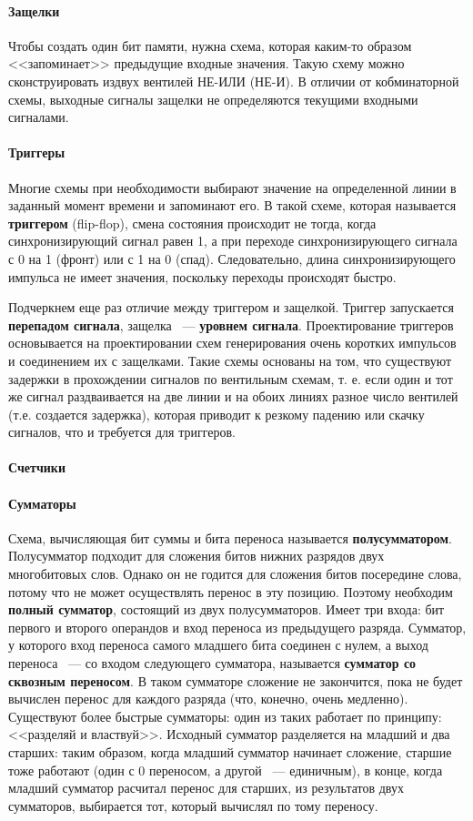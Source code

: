\documentclass[10pt]{article}
\begin{document}
	\paragraph{Защелки}
	Чтобы создать один бит памяти, нужна схема, которая каким-то образом <<запоминает>> предыдущие входные значения. Такую схему можно сконструировать издвух вентилей НЕ-ИЛИ (НЕ-И). В отличии от кобминаторной схемы, выходные сигналы защелки не определяются текущими входными сигналами.
	\paragraph{Триггеры}
	Многие схемы при необходимости выбирают значение на определенной линии в заданный момент времени и запоминают его. В такой схеме, которая называется \textbf{триггером} (flip-flop), смена состояния происходит не тогда, когда синхронизирующий сигнал равен 1, а при переходе синхронизирующего сигнала с 0 на 1 (фронт) или с 1 на 0 (спад). Следовательно, длина синхронизирующего импульса не имеет значения, поскольку переходы происходят быстро.

	Подчеркнем еще раз отличие между триггером и защелкой. Триггер запускается \textbf{перепадом сигнала}, защелка ~--- \textbf{уровнем сигнала}. Проектирование триггеров основывается на проектировании схем генерирования очень коротких импульсов и соединением их с защелками. Такие схемы основаны на том, что существуют задержки в прохождении сигналов по вентильным схемам, т. е. если один и тот же сигнал раздваивается на две линии и на обоих линиях разное число вентилей (т.е. создается задержка), которая приводит к резкому падению или скачку сигналов, что и требуется для триггеров.
	\paragraph{Счетчики}
	\paragraph{Сумматоры}
	Схема, вычисляющая бит суммы и бита переноса называется \textbf{полусумматором}. Полусумматор подходит для сложения битов нижних разрядов двух многобитовых слов. Однако он не годится для сложения битов посередине слова, потому что не может осуществлять перенос в эту позицию. Поэтому необходим \textbf{полный сумматор}, состоящий из двух полусумматоров. Имеет три входа: бит первого и второго операндов и вход переноса из предыдущего разряда. Сумматор, у которого вход переноса самого младшего бита соединен с нулем, а выход переноса ~--- со входом следующего сумматора, называется \textbf{сумматор со сквозным переносом}. В таком сумматоре сложение не закончится, пока не будет вычислен перенос для каждого разряда (что, конечно, очень медленно). Существуют более быстрые сумматоры: один из таких работает по принципу: <<разделяй и властвуй>>. Исходный сумматор разделяется на младший и два старших: таким образом, когда младший сумматор начинает сложение, старшие тоже работают (один с 0 переносом, а другой ~--- единичным), в конце, когда младший сумматор расчитал перенос для старших, из результатов двух сумматоров, выбирается тот, который вычислял по тому переносу.
\end{document}
